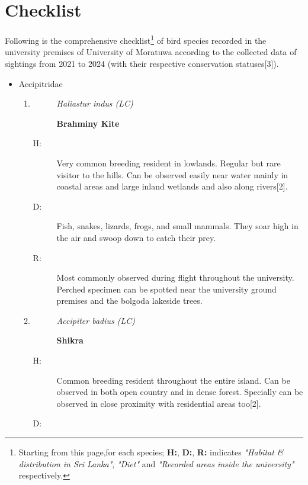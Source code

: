 \chapter{Checklist}
\label{cp:checklist}
Following is the comprehensive checklist\footnote{Starting from this page,for each species; \textbf{H:}, \textbf{D:}, \textbf{R:} indicates \textit{"Habitat \& distribution in Sri Lanka"}, \textit{"Diet"} and \textit{"Recorded areas inside the university"} respectively.} of bird species recorded in the university premises of University of Moratuwa according to the collected data of sightings from 2021 to 2024 (with their respective conservation statuses[3]).

\begin{itemize}%
\item%
 Accipitridae%
\begin{enumerate}%
\item%
\begin{description}%
\item[]%
\textit{Haliastur indus (LC)}%
\item[]%
\textbf{Brahminy Kite}%
\end{description}%
\begin{description}%
\item[H: ]%
Very common breeding resident in lowlands. Regular but rare visitor to the hills. Can be observed easily near water mainly in coastal areas and large inland wetlands and also along rivers{[}2{]}.%
\item[D: ]%
Fish, snakes, lizards, frogs, and small mammals. They soar high in the air and swoop down to catch their prey.%
\item[R: ]%
Most commonly observed during flight throughout the university. Perched specimen can be spotted near the university ground premises and the bolgoda lakeside trees.%
\end{description}%
\item%
\begin{description}%
\item[]%
\textit{Accipiter badius (LC)}%
\item[]%
\textbf{Shikra}%
\end{description}%
\begin{description}%
\item[H: ]%
Common breeding resident throughout the entire island. Can be observed in both open country and in dense forest. Specially can be observed in close proximity with residential areas too{[}2{]}.%
\item[D: ]%

\end{description}
\end{enumerate}
\end{itemize}
